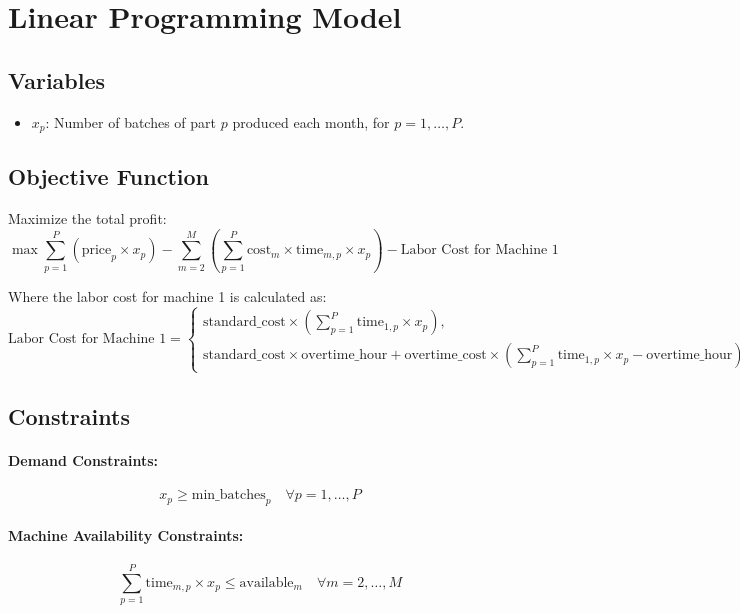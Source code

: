 \documentclass{article}
\begin{document}
\section*{Linear Programming Model}

\subsection*{Variables}
\begin{itemize}
    \item $x_p$: Number of batches of part $p$ produced each month, for $p = 1, \ldots, P$.
\end{itemize}

\subsection*{Objective Function}
Maximize the total profit:
\[
\max \sum_{p=1}^{P} \left( \text{price}_p \times x_p \right) - \sum_{m=2}^{M} \left( \sum_{p=1}^{P} \text{cost}_m \times \text{time}_{m,p} \times x_p \right) 
- \text{Labor Cost for Machine 1}
\]

Where the labor cost for machine 1 is calculated as:
\[
\text{Labor Cost for Machine 1} = 
\begin{cases} 
\text{standard_cost} \times \left(\sum_{p=1}^{P} \text{time}_{1,p} \times x_p\right), & \text{if } \sum_{p=1}^{P} \text{time}_{1,p} \times x_p \leq \text{overtime_hour} \\ 
\text{standard_cost} \times \text{overtime_hour} + \text{overtime_cost} \times \left(\sum_{p=1}^{P} \text{time}_{1,p} \times x_p - \text{overtime_hour}\right), & \text{otherwise}
\end{cases}
\]

\subsection*{Constraints}

\paragraph{Demand Constraints:}
\[
x_p \geq \text{min_batches}_p \quad \forall p = 1, \ldots, P
\]

\paragraph{Machine Availability Constraints:}
\[
\sum_{p=1}^{P} \text{time}_{m,p} \times x_p \leq \text{available}_m \quad \forall m = 2, \ldots, M
\]
\end{document}
